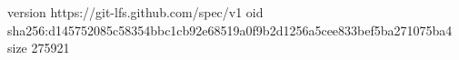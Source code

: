 version https://git-lfs.github.com/spec/v1
oid sha256:d145752085c58354bbc1cb92e68519a0f9b2d1256a5cee833bef5ba271075ba4
size 275921
